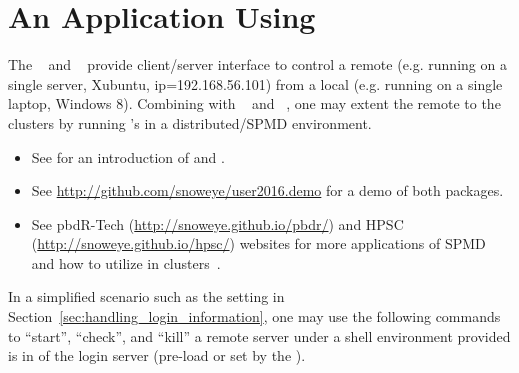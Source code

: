 
\section[An Application Using \pkg{remoter}]{An Application Using }
\label{sec:application_rr}

The ~\citep{remoter} and ~\citep{Chen2015pbdZMQpackage}
provide client/server interface to control a remote 
(e.g. running on a single server, Xubuntu, ip=192.168.56.101)
from a local  (e.g. running on a single laptop, Windows 8).
Combining with ~\citep{Chen2012pbdMPIpackage} and
~\citep{pbdCS}, one may extent the
remote  to the  clusters by running
's in a distributed/SPMD environment.
\begin{itemize}
\item See \citet{xsede16} for an introduction of  and .
\item See \url{http://github.com/snoweye/user2016.demo}
      for a demo of both packages.
\item See pbdR-Tech (\url{http://snoweye.github.io/pbdr/}) and
      HPSC (\url{http://snoweye.github.io/hpsc/}) websites
      for more applications of SPMD and
      how to utilize  in clusters~\citep{hpsc2012}.
\end{itemize}

In a simplified scenario such as the setting in
Section~\ref{sec:handling_login_information}, one may use the following
commands to ``start'', ``check'', and ``kill'' a remote  server
under a shell environment provided  is in 
of the login server (pre-load or set by the ).

